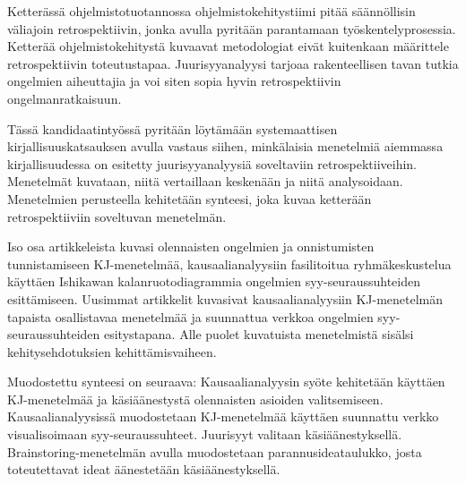%

\begin{fiabstract}

Ketterässä ohjelmistotuotannossa ohjelmistokehitystiimi pitää säännöllisin väliajoin retrospektiivin, jonka avulla pyritään parantamaan työskentelyprosessia. Ketterää ohjelmistokehitystä kuvaavat metodologiat eivät kuitenkaan määrittele retrospektiivin toteutustapaa. Juurisyyanalyysi tarjoaa rakenteellisen tavan tutkia ongelmien aiheuttajia ja voi siten sopia hyvin retrospektiivin ongelmanratkaisuun. 

Tässä kandidaatintyössä pyritään löytämään systemaattisen kirjallisuuskatsauksen avulla vastaus siihen, minkälaisia menetelmiä aiemmassa kirjallisuudessa on esitetty juurisyyanalyysiä soveltaviin retrospektiiveihin. Menetelmät kuvataan, niitä vertaillaan keskenään ja niitä analysoidaan. Menetelmien perusteella kehitetään synteesi, joka kuvaa ketterään retrospektiiviin soveltuvan menetelmän.

Iso osa artikkeleista kuvasi olennaisten ongelmien ja onnistumisten tunnistamiseen KJ-menetelmää, kausaalianalyysiin fasilitoitua ryhmäkeskustelua käyttäen Ishikawan kalanruotodiagrammia ongelmien syy-seuraussuhteiden esittämiseen. Uusimmat artikkelit kuvasivat kausaalianalyysiin KJ-menetelmän tapaista osallistavaa menetelmää ja suunnattua verkkoa ongelmien syy-seuraussuhteiden esitystapana. Alle puolet kuvatuista menetelmistä sisälsi kehitysehdotuksien kehittämisvaiheen.

Muodostettu synteesi on seuraava: Kausaalianalyysin syöte kehitetään käyttäen KJ-menetelmää ja käsiäänestystä olennaisten asioiden valitsemiseen. Kausaalianalyysissä muodostetaan KJ-menetelmää käyttäen suunnattu verkko visualisoimaan syy-seuraussuhteet. Juurisyyt valitaan käsiäänestyksellä. Brainstoring-menetelmän avulla muodostetaan parannusideataulukko, josta toteutettavat ideat äänestetään käsiäänestyksellä.

\end{fiabstract}
